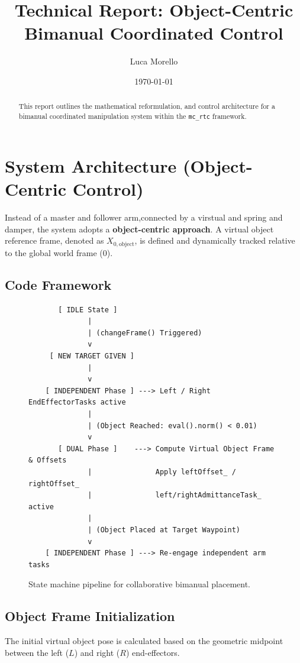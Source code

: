 \documentclass[11pt,a4paper]{article}
\title{\textbf{Technical Report: Object-Centric Bimanual Coordinated Control}}
\author{Luca Morello}
\date{\today}
\begin{document}
\maketitle

\begin{abstract}
This report outlines the mathematical reformulation, and control architecture for a bimanual coordinated manipulation system within the \texttt{mc\_rtc} framework. 
\end{abstract}

\section{System Architecture (Object-Centric Control)}
Instead of a master and follower arm,connected by a virstual and spring and damper, the system adopts a \textbf{object-centric approach}. A virtual object reference frame, denoted as $X_{0,\text{object}}$, is defined and dynamically tracked relative to the global world frame ($0$).

\subsection{Code Framework}
\begin{figure}[htbp]
\centering
\small
\begin{verbatim}
       [ IDLE State ]
              |
              | (changeFrame() Triggered)
              v
     [ NEW TARGET GIVEN ]
              |
              v
    [ INDEPENDENT Phase ] ---> Left / Right EndEffectorTasks active
              |
              | (Object Reached: eval().norm() < 0.01)
              v
       [ DUAL Phase ]    ---> Compute Virtual Object Frame & Offsets
              |               Apply leftOffset_ / rightOffset_
              |               left/rightAdmittanceTask_ active
              |
              | (Object Placed at Target Waypoint)
              v
    [ INDEPENDENT Phase ] ---> Re-engage independent arm tasks
\end{verbatim}
\caption{State machine pipeline for collaborative bimanual placement.}
\label{fig:pipeline}
\end{figure}

\subsection{Object Frame Initialization}
The initial virtual object pose is calculated based on the geometric midpoint between the left ($L$) and right ($R$) end-effectors.
\end{document}

